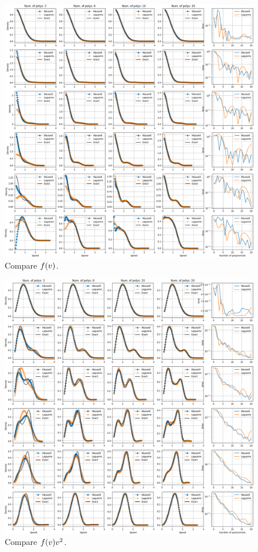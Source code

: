 \documentclass[10pt,letterpaper]{article}
\newcommand{\of}[1]{\mleft( #1 \mright)}
\begin{document}
\begin{figure}[!h]
\centering
\includegraphics[width=.99\textwidth]{plot/density_bolsig.png}
\caption{Compare $f\of{v}$.}
\label{}
\end{figure}
\begin{figure}[!h]
\centering
\includegraphics[width=.99\textwidth]{plot/speed_bolsig.png}
\caption{Compare $f\of{v} v^2$.}
\label{}
\end{figure}
\end{document}
